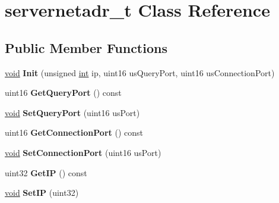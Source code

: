 \hypertarget{classservernetadr__t}{}\section{servernetadr\+\_\+t Class Reference}
\label{classservernetadr__t}
\subsection*{Public Member Functions}
\begin{DoxyCompactItemize}
\item 
\hypertarget{classservernetadr__t_a008b393457dc2ef8d10dce67db5cf12a}{}\hyperlink{SDL__audio_8h_a52835ae37c4bb905b903cbaf5d04b05f}{void} {\bfseries Init} (unsigned \hyperlink{SDL__thread_8h_a6a64f9be4433e4de6e2f2f548cf3c08e}{int} ip, uint16 us\+Query\+Port, uint16 us\+Connection\+Port)\label{classservernetadr__t_a008b393457dc2ef8d10dce67db5cf12a}

\item 
\hypertarget{classservernetadr__t_a8798b6f6539cc5f2e976b8a21c069c8c}{}uint16 {\bfseries Get\+Query\+Port} () const \label{classservernetadr__t_a8798b6f6539cc5f2e976b8a21c069c8c}

\item 
\hypertarget{classservernetadr__t_a07ffb7a94843f3cf7f168fc55f5f3fed}{}\hyperlink{SDL__audio_8h_a52835ae37c4bb905b903cbaf5d04b05f}{void} {\bfseries Set\+Query\+Port} (uint16 us\+Port)\label{classservernetadr__t_a07ffb7a94843f3cf7f168fc55f5f3fed}

\item 
\hypertarget{classservernetadr__t_a2438ab85e904c8288b1ed4288beec7ab}{}uint16 {\bfseries Get\+Connection\+Port} () const \label{classservernetadr__t_a2438ab85e904c8288b1ed4288beec7ab}

\item 
\hypertarget{classservernetadr__t_af228deefd75f58e0f83f3558053a2c97}{}\hyperlink{SDL__audio_8h_a52835ae37c4bb905b903cbaf5d04b05f}{void} {\bfseries Set\+Connection\+Port} (uint16 us\+Port)\label{classservernetadr__t_af228deefd75f58e0f83f3558053a2c97}

\item 
\hypertarget{classservernetadr__t_a83ace4a5bc9687cffd1760d72b623e53}{}uint32 {\bfseries Get\+I\+P} () const \label{classservernetadr__t_a83ace4a5bc9687cffd1760d72b623e53}

\item 
\hypertarget{classservernetadr__t_aaf40e8505a6ff055247056833d33708c}{}\hyperlink{SDL__audio_8h_a52835ae37c4bb905b903cbaf5d04b05f}{void} {\bfseries Set\+I\+P} (uint32)\label{classservernetadr__t_aaf40e8505a6ff055247056833d33708c}


\end{DoxyCompactItemize}
